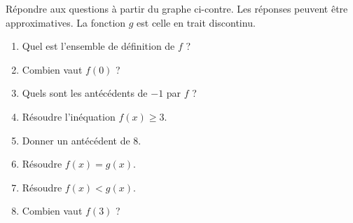 
\begin{exercice}\label{exosmath-0015}

    \begin{multicols}{2}

        Répondre aux questions à partir du graphe ci-contre. Les réponses peuvent être approximatives. La fonction \( g\) est celle en trait discontinu.
        \begin{enumerate}
            \item
                Quel est l'ensemble de définition de \( f\) ?
            \item
                Combien vaut \( f(0)\) ?
            \item
                Quels sont les antécédents de \( -1\) par \( f\) ?
            \item
                Résoudre l'inéquation \( f(x)\geq 3\).
            \item
                Donner un antécédent de \( 8\).
            \item
                Résoudre \( f(x)=g(x)\).
            \item
                Résoudre \( f(x)<g(x)\).
            \item
                Combien vaut \( f(3)\) ?
        \end{enumerate}
        
        \columnbreak

        \begin{center}

        \end{center}

    \end{multicols}

\end{exercice}
